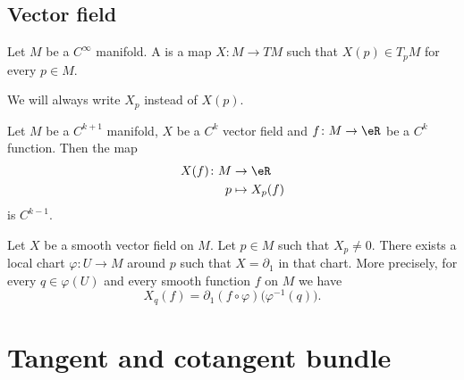 \subsection{Vector field}

\begin{definition}        \label{DEFooAATTooLhNqDb}
	Let \( M\) be a \(  C^{\infty}\) manifold. A  is a map \( X\colon M\to TM\) such that \( X(p)\in T_pM\) for every \( p\in M\).

	We will always write \( X_p\) instead of \( X(p)\).
\end{definition}

\begin{proposition}         \label{PROPooGYWRooPIyocN}
	Let \( M\) be a \( C^{k+1}\) manifold, \( X\) be a \( C^k\) vector field and \( f\colon M \to \eR\) be a \( C^k\) function. Then the map
	\begin{equation}
		\begin{aligned}
			X(f)\colon M & \to \eR        \\
			p            & \mapsto X_p(f)
		\end{aligned}
	\end{equation}
	is \( C^{k-1}\).
\end{proposition}

\begin{lemma}       \label{LEMooLNIAooCmbLQp}
	Let \( X\) be a smooth vector field on \( M\). Let \( p\in M\) such that \( X_p\neq 0\). There exists a local chart \( \varphi\colon U\to M\) around \( p\) such that \( X=\partial_1\) in that chart. More precisely, for every \( q\in \varphi(U)\) and every smooth function \( f\) on \( M\) we have
	\begin{equation}
		X_q(f)=\partial_1(f\circ \varphi)\big( \varphi^{-1}(q) \big).
	\end{equation}
\end{lemma}


\section{Tangent and cotangent bundle}

